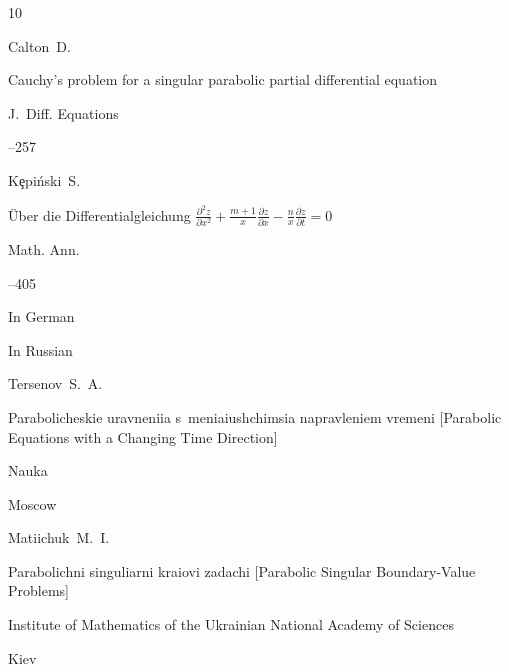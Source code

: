 \begin{thebibliography}{10}

\by Calton~D.

\paper Cauchy's problem for a singular parabolic partial differential equation

\jour J.~Diff. Equations




--257









\by K\c{e}pi\'nski~S.

\paper \"Uber die Differentialgleichung $\frac{\partial^2 z }{\partial x^2}+\frac{m+1}{x}\frac{\partial z }{\partial x} -\frac{n}{x}\frac{\partial z }{\partial t}=0$

\jour   Math. Ann.




--405


\lang In German




\lang In Russian

\by Tersenov~S.~A.

\book Parabolicheskie uravneniia s~meniaiushchimsia napravleniem vremeni \rm [Parabolic Equations with a Changing Time Direction]


\publ Nauka

\publaddr Moscow





\by Matiichuk~M.~I.

\book  Parabolichni singuliarni kraiovi zadachi \rm [Parabolic Singular Boundary-Value Problems]


\publ Institute of Mathematics of the Ukrainian National  Academy of Sciences

\publaddr Kiev



\end{thebibliography}
